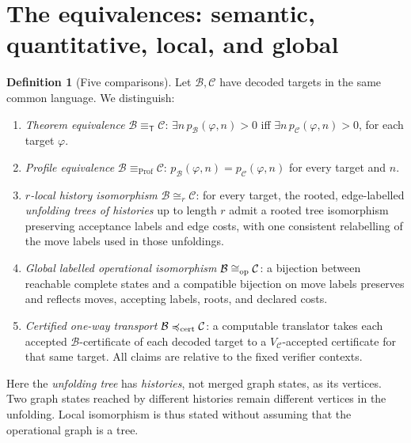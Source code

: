 \documentclass[11pt,letterpaper]{article}
\theoremstyle{definition}
\newtheorem{definition}[theorem]{Definition}
\newcommand{\Prof}{\operatorname{Prof}}
\newcommand{\B}{\mathcal B}
\newcommand{\T}{\mathsf T}
\newcommand{\eqT}{\equiv_{\T}}
\begin{document}
\section{The equivalences: semantic, quantitative, local, and global}
\begin{definition}[Five comparisons]\label{def:eq}
Let $\B,\mathcal C$ have decoded targets in the same common language. We distinguish:
\begin{enumerate}[label=\textbf{(\roman*)},leftmargin=*]
\item \emph{Theorem equivalence} $\B\eqT\mathcal C$: $\exists n\,p_\B(\varphi,n)>0$ iff $\exists n\,p_{\mathcal C}(\varphi,n)>0$, for each target $\varphi$.
\item \emph{Profile equivalence} $\B\equiv_{\Prof}\mathcal C$: $p_\B(\varphi,n)=p_{\mathcal C}(\varphi,n)$ for every target and $n$.
\item \emph{$r$-local history isomorphism} $\B\cong_r\mathcal C$: for every target, the rooted, edge-labelled \emph{unfolding trees of histories} up to length $r$ admit a rooted tree isomorphism preserving acceptance labels and edge costs, with one consistent relabelling of the move labels used in those unfoldings.
\item \emph{Global labelled operational isomorphism} $\B\cong_{\rm op}\mathcal C$: a bijection between reachable complete states and a compatible bijection on move labels preserves and reflects moves, accepting labels, roots, and declared costs.
\item \emph{Certified one-way transport} $\B\preccurlyeq_{\rm cert}\mathcal C$: a computable translator takes each accepted $\B$-certificate of each decoded target to a $V_{\mathcal C}$-accepted certificate for that same target. All claims are relative to the fixed verifier contexts.
\end{enumerate}
\end{definition}
\noindent Here the \emph{unfolding tree} has \emph{histories}, not merged graph states, as its vertices. Two graph states reached by different histories remain different vertices in the unfolding. Local isomorphism is thus stated without assuming that the operational graph is a tree.
\end{document}
